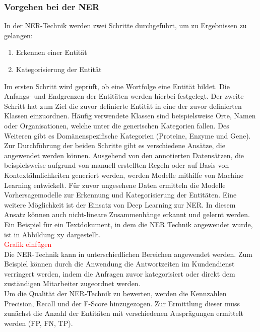 \subsubsection{Vorgehen bei der NER}
In der \ac{NER}-Technik werden zwei Schritte durchgeführt, um zu Ergebnissen zu gelangen:

\begin{enumerate}
    \item Erkennen einer Entität
    \item Kategorisierung der Entität
\end{enumerate}


Im ersten Schritt wird geprüft, ob eine Wortfolge eine Entität bildet. Die Anfangs- und Endgrenzen der Entitäten werden hierbei festgelegt. Der zweite Schritt hat zum Ziel die zuvor definierte Entität in eine der zuvor definierten Klassen einzuordnen.
Häufig verwendete Klassen sind beispielsweise Orte, Namen oder Organisationen, welche unter die generischen Kategorien fallen. Des Weiteren gibt es Domänenspezifische Kategorien (Proteine, Enzyme und Gene).
\\
Zur Durchführung der beiden Schritte gibt es verschiedene Ansätze, die angewendet werden können. Ausgehend von den annotierten Datensätzen, die beispielsweise aufgrund von manuell erstellten Regeln oder auf Basis von Kontextähnlichkeiten generiert werden, werden Modelle mithilfe von Machine Learning entwickelt.
Für zuvor ungesehene Daten ermitteln die Modelle Vorhersagemodelle zur Erkennung und Kategorisierung der Entitäten. Eine weitere Möglichkeit ist der Einsatz von Deep Learning zur \ac{NER}. In diesem Ansatz können auch nicht-lineare Zusammenhänge erkannt und gelernt werden.
\\
Ein Beispiel für ein Textdokument, in dem die \ac{NER} Technik angewendet wurde, ist in Abbildung xy dargestellt.\\
\textcolor{red}{Grafik einfügen} \\

Die \ac{NER}-Technik kann in unterschiedlichen Bereichen angewendet werden. Zum Beispiel können durch die Anwendung die Antwortzeiten im Kundendienst verringert werden, indem die Anfragen zuvor kategorisiert oder direkt dem zuständigen Mitarbeiter zugeordnet werden.
\\
Um die Qualität der \ac{NER}-Technik zu bewerten, werden die Kennzahlen Precision, Recall und der F-Score hinzugezogen.
Zur Ermittlung dieser muss zunächst die Anzahl der Entitäten mit verschiedenen Ausprägungen ermittelt werden (\ac{FP}, \ac{FN}, \ac{TP}).

